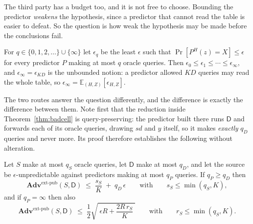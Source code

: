 \documentclass{aicr-solution}
\newcommand{\Adv}{\mathbf{Adv}}
\newcommand{\extp}{\mathrm{ext}\text{-}\mathrm{pub}}
\newcommand{\sd}{\mathit{sd}}
\begin{document}
The third party has a budget too, and it is not free to choose. Bounding the predictor
\emph{weakens} the hypothesis, since a predictor that cannot read the table is easier to defeat. So
the question is how weak the hypothesis may be made before the conclusions fail.
\begin{definition}\label{def:epsq}
For $q \in \{0,1,2,\dots\} \cup \{\infty\}$ let $\epsilon_q$ be the least $\epsilon$ such that
$\Pr[P^{H}(z) = X] \le \epsilon$ for every predictor $P$ making at most $q$ oracle queries. Then
$\epsilon_0 \le \epsilon_1 \le \cdots \le \epsilon_\infty$, and $\epsilon_\infty = \epsilon_{KD}$ is
the unbounded notion: a predictor allowed $KD$ queries may read the whole table, so
$\epsilon_\infty = \mathbb{E}_{(H,Z)}[\epsilon_{H,Z}]$.
\end{definition}
The two routes answer the question differently, and the difference is exactly the difference between
them. Note first that the reduction inside Theorem~\ref{thm:badcell} is query-preserving: the
predictor built there runs $\mathsf{D}$ and forwards each of its oracle queries, drawing $\sd$ and
$y$ itself, so it makes \emph{exactly} $q_D$ queries and never more. Its proof therefore establishes
the following without alteration.
\begin{theorem}\label{thm:three}
Let $S$ make at most $q_S$ oracle queries, let $\mathsf{D}$ make at most $q_D$, and let the source
be $\epsilon$-unpredictable against predictors making at most $q_P$ queries. If $q_P \ge q_D$ then
\begin{equation}\label{eq:three-badcell}
  \Adv^{\extp}(S,\mathsf{D}) \;\le\; \frac{s_S}{K} \;+\; q_D\,\epsilon
  \qquad\text{with}\qquad s_S \le \min(q_S,K) ,
\end{equation}
and if $q_P = \infty$ then also
\begin{equation}\label{eq:three-lhl}
  \Adv^{\extp}(S,\mathsf{D}) \;\le\; \frac12\sqrt{\;\epsilon R + \frac{2R\,r_S}{K}\;}
  \qquad\text{with}\qquad r_S \le \min(q_S,K) .
\end{equation}
\end{theorem}
\end{document}
